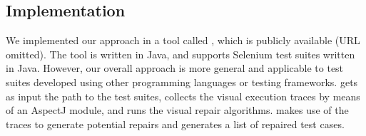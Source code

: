 \subsection{Implementation}\label{sec:implementation}

We implemented our approach in a tool called \tool, which is publicly available (URL omitted). 
The tool is written in Java, and supports Selenium test suites written in Java. However, our overall approach is more general and applicable to test suites developed using other programming languages or testing frameworks. 
\tool gets as input the path to the test suites, collects the visual execution traces by means of an AspectJ module, and runs the visual repair algorithms. 
\tool makes use of the traces to generate potential repairs and generates a list of repaired test cases.

